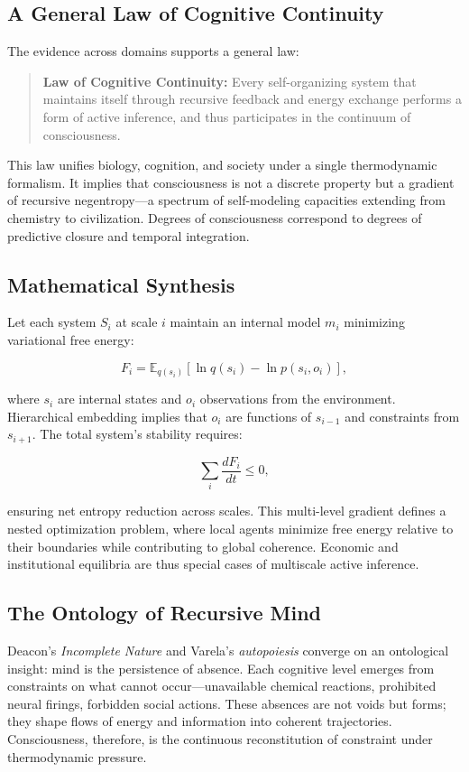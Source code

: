 \documentclass[11pt,a4paper]{article}
\begin{document}
\subsection{A General Law of Cognitive Continuity}

The evidence across domains supports a general law:

\begin{quote}
\textbf{Law of Cognitive Continuity:} Every self-organizing system that maintains itself through recursive feedback and energy exchange performs a form of active inference, and thus participates in the continuum of consciousness.
\end{quote}

This law unifies biology, cognition, and society under a single thermodynamic formalism.  It implies that consciousness is not a discrete property but a gradient of recursive negentropy—a spectrum of self-modeling capacities extending from chemistry to civilization.  Degrees of consciousness correspond to degrees of predictive closure and temporal integration.

\subsection{Mathematical Synthesis}

Let each system $S_i$ at scale $i$ maintain an internal model $m_i$ minimizing variational free energy:

\[
F_i = \mathbb{E}_{q(s_i)}[\ln q(s_i) - \ln p(s_i, o_i)],
\]

where $s_i$ are internal states and $o_i$ observations from the environment.  Hierarchical embedding implies that $o_i$ are functions of $s_{i-1}$ and constraints from $s_{i+1}$.  The total system’s stability requires:

\[
\sum_i \frac{dF_i}{dt} \le 0,
\]

ensuring net entropy reduction across scales.  This multi-level gradient defines a nested optimization problem, where local agents minimize free energy relative to their boundaries while contributing to global coherence.  Economic and institutional equilibria are thus special cases of multiscale active inference.

\subsection{The Ontology of Recursive Mind}

Deacon’s \emph{Incomplete Nature} \citep{Deacon2011IncompleteNature} and Varela’s \emph{autopoiesis} \citep{MaturanaVarela1980Autopoiesis} converge on an ontological insight: mind is the persistence of absence.  Each cognitive level emerges from constraints on what cannot occur—unavailable chemical reactions, prohibited neural firings, forbidden social actions.  These absences are not voids but forms; they shape flows of energy and information into coherent trajectories.  Consciousness, therefore, is the continuous reconstitution of constraint under thermodynamic pressure.
\end{document}

